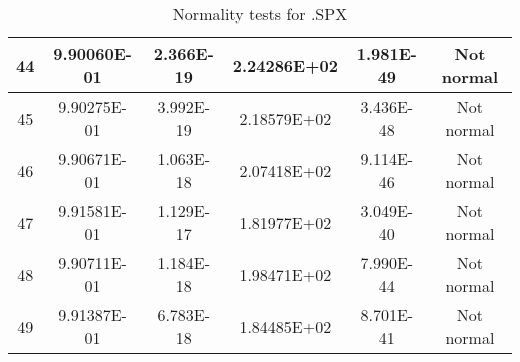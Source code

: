 \begin{table}[h]
\begin{tabular}{|c|c|c|c|c|c|}
		44 & 9.90060E-01 & 2.366E-19 & 2.24286E+02 & 1.981E-49 & Not normal\\\hline
		45 & 9.90275E-01 & 3.992E-19 & 2.18579E+02 & 3.436E-48 & Not normal\\\hline
		46 & 9.90671E-01 & 1.063E-18 & 2.07418E+02 & 9.114E-46 & Not normal\\\hline
		47 & 9.91581E-01 & 1.129E-17 & 1.81977E+02 & 3.049E-40 & Not normal\\\hline
		48 & 9.90711E-01 & 1.184E-18 & 1.98471E+02 & 7.990E-44 & Not normal\\\hline
		49 & 9.91387E-01 & 6.783E-18 & 1.84485E+02 & 8.701E-41 & Not normal\\\hline
	\end{tabular}
	\caption{Normality tests for .SPX}
	\label{tab:normality_tests_SPX}
\end{table}
